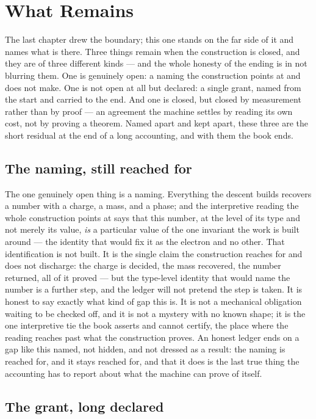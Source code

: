 \chapter{What Remains}
\label{chap:what-remains}

The last chapter drew the boundary; this one stands on the far side of it and names what is there. Three
things remain when the construction is closed, and they are of three different kinds --- and the whole
honesty of the ending is in not blurring them. One is genuinely open: a naming the construction points at
and does not make. One is not open at all but declared: a single grant, named from the start and carried to
the end. And one is closed, but closed by measurement rather than by proof --- an agreement the machine
settles by reading its own cost, not by proving a theorem. Named apart and kept apart, these three are the
short residual at the end of a long accounting, and with them the book ends.

\section{The naming, still reached for}
\label{se:the-naming-still-reached-for}

The one genuinely open thing is a naming. Everything the descent builds recovers a number with a charge, a
mass, and a phase; and the interpretive reading the whole construction points at says that this number, at
the level of its type and not merely its value, \emph{is} a particular value of the one invariant the work is
built around --- the identity that would fix it as the electron and no other. That identification is not
built. It is the single claim the construction reaches for and does not discharge: the charge is decided, the
mass recovered, the number returned, all of it proved --- but the type-level identity that would name the
number is a further step, and the ledger will not pretend the step is taken. It is honest to say exactly what
kind of gap this is. It is not a mechanical obligation waiting to be checked off, and it is not a mystery
with no known shape; it is the one interpretive tie the book asserts and cannot certify, the place where the
reading reaches past what the construction proves. An honest ledger ends on a gap like this named, not
hidden, and not dressed as a result: the naming is reached for, and it stays reached for, and that it does is
the last true thing the accounting has to report about what the machine can prove of itself.

\section{The grant, long declared}
\label{se:the-grant-long-declared}

